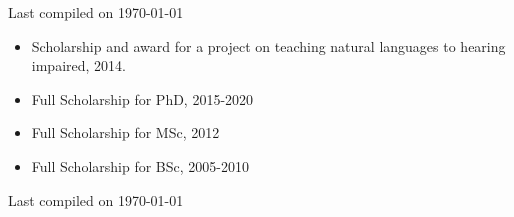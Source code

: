 





\vspace{-4mm}

\spacedhrule{0.9em}{-0.4em}



\vspace{-5mm}

\spacedhrule{1.6em}{-0.4em}



\spacedhrule{-0.2em}{-0.4em}




\spacedhrule{0.5em}{-0.4em}



\vfill \hfill \small Last compiled on \today

\newpage

\spacedhrule{0.5em}{-0.4em}



\spacedhrule{0.5em}{-0.4em} %


\begin{itemize}
    \item Scholarship and award for a project on teaching natural languages to hearing impaired, 2014.
    \item Full Scholarship for PhD, 2015-2020
    \item Full Scholarship for MSc, 2012 
    \item Full Scholarship for BSc, 2005-2010
\end{itemize}

\spacedhrule{0.5em}{-0.4em} %

\vfill \hfill \small Last compiled on \today


